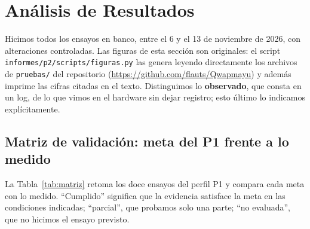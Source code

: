 \section{Análisis de Resultados}
\label{sec:resultados}

Hicimos todos los ensayos en banco, entre el 6 y el 13 de noviembre de 2026, con alteraciones controladas. Las figuras de esta sección son originales: el script \texttt{informes/p2/scripts/figuras.py} las genera leyendo directamente los archivos de \texttt{pruebas/} del repositorio (\url{https://github.com/flauts/Qwapmayu}) y además imprime las cifras citadas en el texto. Distinguimos lo \textbf{observado}, que consta en un log, de lo que vimos en el hardware sin dejar registro; esto último lo indicamos explícitamente.

\subsection{Matriz de validación: meta del P1 frente a lo medido}
\label{sec:matriz}

La Tabla~\ref{tab:matriz} retoma los doce ensayos del perfil P1 y compara cada meta con lo medido. ``Cumplido'' significa que la evidencia satisface la meta en las condiciones indicadas; ``parcial'', que probamos solo una parte; ``no evaluada'', que no hicimos el ensayo previsto.

